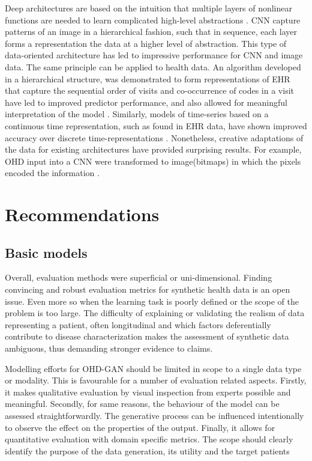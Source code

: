 Deep architectures are based on the intuition that multiple layers of nonlinear functions are needed to learn complicated high-level abstractions \cite{Bengio_2009}. CNN capture patterns of an image in a hierarchical fashion, such that in sequence, each layer forms a representation the data at a higher level of abstraction. This type of data-oriented architecture has led to impressive performance for CNN and image data. The same principle can be applied to health data. An algorithm developed in a hierarchical structure, was demonstrated to form representations of EHR that capture the sequential order of visits and co-occurrence of codes in a visit have led to improved predictor performance, and also allowed for meaningful interpretation of the model \cite{choi2016multi}. Similarly, models of time-series based on a continuous time representation, such as found in EHR data, have shown improved accuracy over discrete time-representations \cite{rubanova2019latent,de2019gru}. Nonetheless, creative adaptations of the data for existing architectures have provided surprising results. For example, OHD input into a CNN were transformed to image(bitmaps) in which the pixels encoded the information \cite{Fukae2020}.

\section{Recommendations}\label{sec:recommend}
\subsection{Basic models}\label{sec:basic}

Overall, evaluation methods were superficial or uni-dimensional. Finding convincing and robust evaluation metrics for synthetic health data is an open issue. Even more so when the learning task is poorly defined or the scope of the problem is too large. The difficulty of explaining or validating the realism of data representing a patient, often longitudinal and which factors deferentially contribute to disease characterization makes the assessment of synthetic data ambiguous, thus demanding stronger evidence to claims.\par
Modelling efforts for OHD-GAN should be limited in scope to a single data type or modality. This is favourable for a number of evaluation related aspects. Firstly, it makes qualitative evaluation by visual inspection from experts possible and meaningful. Secondly, for same reasons, the behaviour of the model can be assessed straightforwardly. The generative process can be influenced intentionally to observe the effect on the properties of the output. Finally, it allows for quantitative evaluation with domain specific metrics. The scope should clearly identify the purpose of the data generation, its utility and the target patients\cite{Capobianco2020,Kappen_2016, Kappen_2016a}

